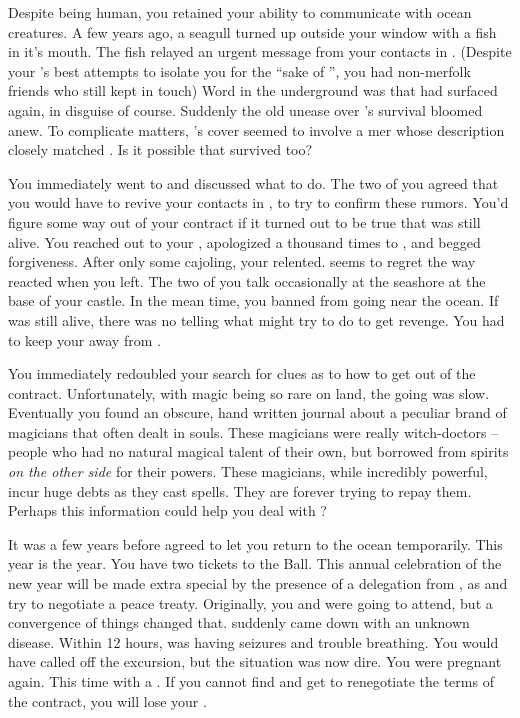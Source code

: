 \documentclass[char]{NeptuneBall}
\begin{document}
Despite being human, you retained your ability to communicate with ocean creatures. A few years ago, a seagull turned up outside your window with a fish in it's mouth. The fish relayed an urgent message from your contacts in \pAtlantis{}. (Despite your \cKing{\parent}'s best attempts to isolate you for the ``sake of \pAtlantis{}'', you had non-merfolk friends who still kept in touch) Word in the underground was that \cWitch{} had surfaced again, in disguise of course.  Suddenly the old unease over \cWitch{}'s survival bloomed anew. To complicate matters, \cWitch{}'s cover seemed to involve a mer\cSlave{\human} whose description closely matched \cSlave{}. Is it possible that \cSlave{\they} survived too? 

You immediately went to \cEric{} and discussed what to do. The two of you agreed that you would have to revive your contacts in \pAtlantis{}, to try to confirm these rumors. You'd figure some way out of your contract if it turned out to be true that \cWitch{} was still alive. You reached out to your \cKing{\parent}, apologized a thousand times to \cKing{\them}, and begged \cKing{\their} forgiveness. After only some cajoling, your \cKing{\parent} relented. \cKing{\They} seems to regret the way \cKing{\they} reacted when you left. The two of you talk occasionally at the seashore at the base of your castle.  In the mean time, you banned \cWillow{} from going near the ocean. If \cWitch{} was still alive, there was no telling what \cWitch{\they} might try to do to get revenge. You had to keep your \cWillow{\offspring} away from \cWitch{}.

You immediately redoubled your search for clues as to how to get out of the contract. Unfortunately, with magic being so rare on land, the going was slow. Eventually you found an obscure, hand written journal about a peculiar brand of magicians that often dealt in souls. These magicians were really witch-doctors -- people who had no natural magical talent of their own, but borrowed from spirits \emph{on the other side} for their powers. These magicians, while incredibly powerful, incur huge debts as they cast spells. They are forever trying to repay them. Perhaps this information could help you deal with \cWitch{}?

It was a few years before \cKing{\King} \cKing{} agreed to let you return to the ocean temporarily. This year is the year. You have two tickets to the \cExExKing{} Ball. This annual celebration of the new year will be made extra special by the presence of a delegation from \pPacifica{}, as \pAtlantis{} and \pPacifica{} try to negotiate a peace treaty. Originally, you and \cEric{} were going to attend, but a convergence of things changed that. \cEric{} suddenly came down with an unknown disease. Within 12 hours, \cEric{} was having seizures and trouble breathing. You would have called off the excursion, but the situation was now dire. You were pregnant again. This time with a \cArielsSon{\offspring}. If you cannot find \cWitch{} and get \cWitch{\them} to renegotiate the terms of the contract, you will lose your \cArielsSon{\offspring} \cArielsSon{}.
\end{document}
